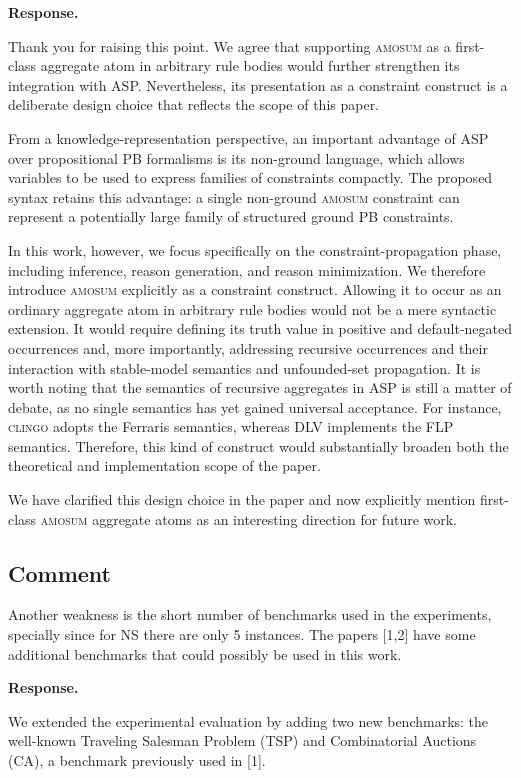 \documentclass[11pt]{article}
\theoremstyle{definition}
\newcommand{\revieweranswered}{\subsection{Comment}}
\newenvironment{response}{
    \color{blue} \textbf{Response.}
}{
}
\begin{document}
\begin{response}
Thank you for raising this point. We agree that supporting \textsc{amosum} as a first-class aggregate atom in arbitrary rule bodies would further strengthen its integration with ASP. Nevertheless, its presentation as a constraint construct is a deliberate design choice that reflects the scope of this paper.

From a knowledge-representation perspective, an important advantage of ASP over propositional PB formalisms is its non-ground language, which allows variables to be used to express families of constraints compactly. The proposed syntax retains this advantage: a single non-ground \textsc{amosum} constraint can represent a potentially large family of structured ground PB constraints.

In this work, however, we focus specifically on the constraint-propagation phase, including inference, reason generation, and reason minimization. We therefore introduce \textsc{amosum} explicitly as a constraint construct. Allowing it to occur as an ordinary aggregate atom in arbitrary rule bodies would not be a mere syntactic extension. It would require defining its truth value in positive and default-negated occurrences and, more importantly, addressing recursive occurrences and their interaction with stable-model semantics and unfounded-set propagation. It is worth noting that the semantics of recursive aggregates in ASP is still a matter of debate, as no single semantics has yet gained universal acceptance. For instance, \textsc{clingo} adopts the Ferraris semantics, whereas DLV implements the FLP semantics.
Therefore, this kind of construct would substantially broaden both the theoretical and implementation scope of the paper. 

We have clarified this design choice in the paper and now explicitly mention first-class \textsc{amosum} aggregate atoms as an interesting direction for future work.
\end{response}

\vspace{0.5cm}

\revieweranswered
Another weakness is the short number of benchmarks used in the experiments,
specially since for NS there are only 5 instances.
The papers [1,2] have some additional benchmarks that could possibly be used in this work.

\begin{response}
We extended the experimental evaluation by adding two new benchmarks: the well-known Traveling Salesman Problem (TSP) and Combinatorial Auctions (CA), a benchmark previously used in [1].
\end{response}
\end{document}
